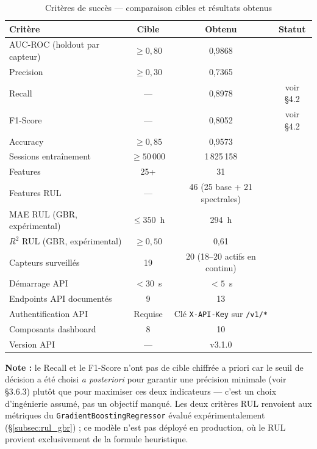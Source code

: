 \documentclass[12pt,a4paper]{report}
\newcommand{\cmark}{\ding{51}}
\begin{document}
\begin{table}[H]
\centering
\caption{Critères de succès — comparaison cibles et résultats obtenus}
\begin{tabular}{lccc}
\toprule
\textbf{Critère} & \textbf{Cible} & \textbf{Obtenu} & \textbf{Statut} \\
\midrule
AUC-ROC (holdout par capteur) & $\geq 0{,}80$  & 0,9868  & \cmark \\
Precision                     & $\geq 0{,}30$  & 0,7365  & \cmark \\
Recall                        & —              & 0,8978  & voir §4.2 \\
F1-Score                      & —              & 0,8052  & voir §4.2 \\
Accuracy                      & $\geq 0{,}85$  & 0,9573  & \cmark \\
Sessions entraînement         & $\geq 50\,000$ & 1\,825\,158 & \cmark \\
Features                      & 25+            & 31      & \cmark \\
Features RUL                  & —              & 46 (25 base + 21 spectrales) & \cmark \\
MAE RUL (GBR, expérimental)   & $\leq 350$~h   & 294~h   & \cmark \\
$R^2$ RUL (GBR, expérimental) & $\geq 0{,}50$  & 0,61    & \cmark \\
Capteurs surveillés           & 19             & 20 (18--20 actifs en continu) & \cmark \\
Démarrage API                 & $< 30$~s       & $< 5$~s & \cmark \\
Endpoints API documentés      & 9              & 13      & \cmark \\
Authentification API          & Requise        & Clé \texttt{X-API-Key} sur \texttt{/v1/*} & \cmark \\
Composants dashboard          & 8              & 10      & \cmark \\
Version API                   & —              & v3.1.0  & \cmark \\
\bottomrule
\end{tabular}
\end{table}

\noindent\textbf{Note :} le Recall et le F1-Score n'ont pas de cible chiffrée a priori
car le seuil de décision a été choisi \textit{a posteriori} pour garantir une précision
minimale (voir §3.6.3) plutôt que pour maximiser ces deux indicateurs — c'est un choix
d'ingénierie assumé, pas un objectif manqué. Les deux critères RUL renvoient aux métriques
du \texttt{GradientBoostingRegressor} évalué expérimentalement (\S\ref{subsec:rul_gbr}) ;
ce modèle n'est pas déployé en production, où le RUL provient exclusivement de la formule
heuristique.
\end{document}
